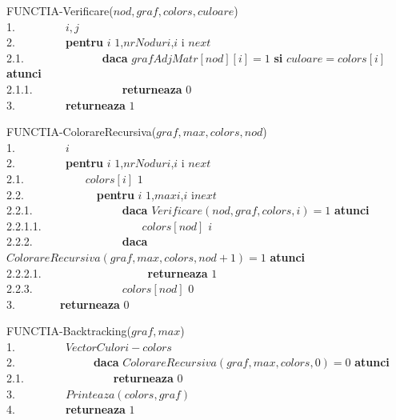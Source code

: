 \documentclass[12pt]{article}
\begin{document}
\begin{center}
\begin{tabbing}
FUNCTIA-Verificare($nod,graf,colors,culoare$) \\
1.\indent \ \ \ \ \ \ \ \ \  $i,j$\\
2.\indent \ \ \ \ \ \ \ \ \ {\bf pentru} $i$ \leftarrow $1$,$nrNoduri$,$i$ \leftarrow i \rightarrow $next$ \\
2.1.\indent \ \ \ \ \ \ \ \ \ \ \ \ \ \  {\bf daca} $grafAdjMatr[nod][i]=1$ {\bf si} $culoare=colors[i]$   {\bf atunci} \\
2.1.1.\indent \ \ \ \ \ \ \ \ \ \ \ \ \ \ \ \ \textbf{returneaza} $0$\\
3.\indent \ \ \ \ \ \ \ \ \ \textbf{returneaza} $1$
\end{tabbing}
\end{center}

\begin{center}
\begin{tabbing}

FUNCTIA-ColorareRecursiva($graf,max,colors,nod$) \\
1.\indent \ \ \ \ \ \ \ \ \  $i$\\
2.\indent \ \ \ \ \ \ \ \ \ {\bf pentru} $i$ \leftarrow $1$,$nrNoduri$,$i$ \leftarrow i \rightarrow $next$ \\
2.1.\indent \ \ \ \ \ \ \ \ \ \ \ $colors[i]$ \leftarrow $1$\\
2.2.\indent \ \ \ \ \ \ \ \ \ \ \ \ \  {\bf pentru} $i$ \leftarrow $1$,$maxi$,$i$ \leftarrow i\rightarrow $next$ \\
2.2.1.\indent \ \ \ \ \ \ \ \ \ \ \ \ \ \ \ \  {\bf daca} $Verificare(nod,graf,colors,i)=1$  {\bf atunci} \\
2.2.1.1.\indent \ \ \ \ \ \ \ \ \ \ \ \ \ \ \ \ \ \ $colors[nod]$ \leftarrow $i$ \\
2.2.2.\indent \ \ \ \ \ \ \ \ \ \ \ \ \ \ \ \  {\bf daca} $ColorareRecursiva(graf,max,colors,nod+1)=1$  {\bf atunci} \\
2.2.2.1.\indent \ \ \ \ \ \ \ \ \ \ \ \ \ \ \ \ \ \ \ \textbf{returneaza} $1$\\
2.2.3.\indent \ \ \ \ \ \ \ \ \ \ \ \ \ \ \ \  $colors[nod]$ \leftarrow $0$ \\
3.\indent \ \ \ \ \ \ \ \   \textbf{returneaza} $0$
\end{tabbing}
\end{center}

\begin{center}
\begin{tabbing}
FUNCTIA-Backtracking($graf,max$) \\
1.\indent \ \ \ \ \ \ \ \ \  $VectorCulori - colors$\\
2.\indent \ \ \ \ \ \ \ \ \ \ \ \ \ \  {\bf daca} $ColorareRecursiva(graf,max,colors,0)=0$   {\bf atunci} \\
2.1.\indent \ \ \ \ \ \ \ \ \ \ \ \ \ \ \ \ \textbf{returneaza} $0$\\
3.\indent \ \ \ \ \ \ \ \ \ $Printeaza(colors,graf)$\\
4.\indent \ \ \ \ \ \ \ \ \ \textbf{returneaza} $1$\\
\end{tabbing}
\end{center}
\pagebreak
\end{document}

